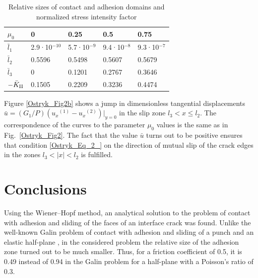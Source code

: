 \begin{table}[!h]
	\centering 
\caption{Relative sizes of contact and adhesion domains and normalized stress intensity factor}\label{Ostryk_Tab}
\begin{tabular*}{.7\textwidth}{@{\extracolsep{\fill}}lllll} 
	\toprule 
	$\mu _{0} $ & 0 & 0.25 & 0.5 & 0.75 \\ \midrule 
	$\bar{l}_{1} $ & 2.9·10$^{-10}$ & 5.7·10$^{-9}$ & 9.4·10$^{-8}$ & 9.3·10$^{-7}$ \\ 
	$\bar{l}_{2} $ & 0.5596 & 0.5498 & 0.5607 & 0.5679 \\ 
	$\bar{l}_{3} $ & 0 & 0.1201 & 0.2767 & 0.3646 \\ 
	$-\bar{K}_{{\rm II}} $ & 0.1505 & 0.2209 & 0.3236 & 0.4474 \\ \bottomrule
\end{tabular*}
\end{table}

Figure \ref{Ostryk_Fig2b}  shows a jump in dimensionless tangential displacements $\bar{u}=(G_{1}/P)(u_{x}{}^{(1)} -u_{x}{}^{(2)} )|_{y=0} $ in the slip zone $l_{3} <x\le l_{2} $. The correspondence of the curves to the parameter $\mu _{0} $ values is the same as in Fig.~\ref{Ostryk_Fig2}. The fact that the value $\bar{u}$ turns out to be positive ensures that condition \eqref{Ostryk_Eq_2_} on the direction of mutual slip of the crack edges in the zones $l_{3} <\left|x\right|<l_{2} $ is fulfilled.

\section{Conclusions}

Using the Wiener--Hopf method, an analytical solution to the problem of contact with adhesion and sliding of the faces of an interface crack was found. Unlike the well-known Galin problem of contact with adhesion and sliding of a punch and an elastic half-plane \cite{Ostryk78}, in the considered problem the relative size of the adhesion zone turned out to be much smaller. Thus, for a friction coefficient of 0.5, it is 0.49 instead of 0.94 in the Galin problem for a half-plane with a Poisson's ratio of 0.3.


